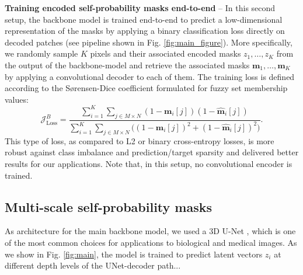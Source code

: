\textbf{Training encoded self-probability masks end-to-end} --
In this second setup, the backbone model is trained end-to-end to predict a low-dimensional representation of the masks by applying a binary classification loss directly on decoded patches (see pipeline shown in Fig. \ref{fig:main_figure}). 
More specifically, we randomly sample $K$ pixels and their associated encoded masks $z_1, \ldots, z_K$ from the output of the backbone-model and retrieve the associated masks $\mathbf{m}_1, \ldots, \mathbf{m}_K$ by applying a convolutional decoder to each of them. 
The training loss is defined according to the S\o rensen-Dice coefficient \cite{dice1945measures,sorensen1948method} formulated for fuzzy set membership values:
\begin{equation}
\mathcal{J}^B_{\mathrm{Loss}} = \frac{\sum_{i=1}^K \sum_{j\in M\times N} (1-\mathbf{m}_i[j])(1-\hat{\mathbf{m}}_i[j])}{\sum_{i=1}^K \sum_{j\in M\times N} \big( (1-\mathbf{m}_i[j])^2 + (1-\hat{\mathbf{m}}_i[j])^2 \big)}.
\end{equation} 
This type of loss, as compared to L2 or binary cross-entropy losses, is more robust against class imbalance and prediction/target sparsity and delivered better results for our applications.
Note that, in this setup, no convolutional encoder is trained.

\subsection{Multi-scale self-probability masks}\label{sec:multiscale_patches}
As architecture for the main backbone model, we used a 3D U-Net \cite{ronneberger2015u, cciccek20163d}, which is one of the most common choices for applications to biological and medical images.
As we show in Fig. \ref{fig:main}, the model is trained to predict latent vectors $z_i$ at different depth levels of the UNet-decoder path...


